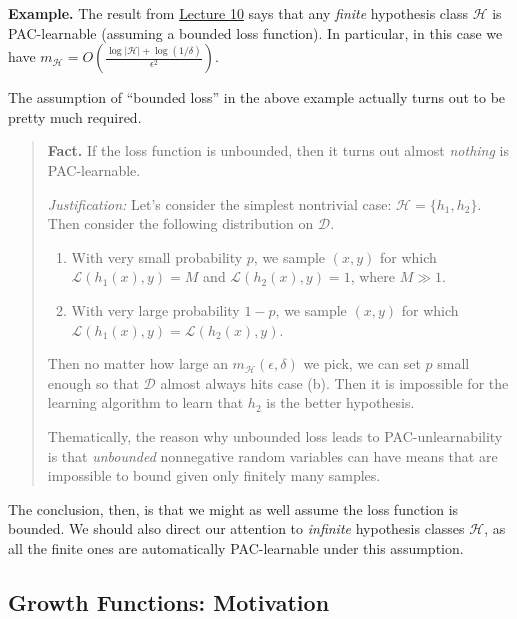\textbf{Example.}
The result from
\href{/6.790/lectures/10/#estimation-error-bounding}{Lecture 10}
says that any \emph{finite} hypothesis class $\mathcal{H}$
is PAC-learnable (assuming a bounded loss function).
In particular, in this case we have
$m_{\mathcal{H}} = O\left(
    \frac{\log|\mathcal{H}| + \log(1/\delta)}{\epsilon^2}
\right)$.

The assumption of ``bounded loss'' in the above example
actually turns out to be pretty much required.

\begin{quote}
    \textbf{Fact.}
    If the loss function is unbounded,
    then it turns out almost \emph{nothing} is PAC-learnable.

    \emph{Justification:}
    Let's consider the simplest nontrivial case: $\mathcal{H} = \{h_1, h_2\}$.
    Then consider the following distribution on $\mathcal{D}$.
    \begin{enumerate}
        \item[(a)] With very small probability $p$,
        we sample $(x, y)$ for which
        $\mathcal{L}(h_1(x), y) = M$
        and $\mathcal{L}(h_2(x), y) = 1$,
        where $M \gg 1$.
        \item[(b)] With very large probability $1 - p$,
        we sample $(x, y)$ for which
        $\mathcal{L}(h_1(x), y) = \mathcal{L}(h_2(x), y)$.
    \end{enumerate}
    Then no matter how large an $m_{\mathcal{H}}(\epsilon, \delta)$ we pick,
    we can set $p$ small enough so that
    $\mathcal{D}$ almost always hits case (b).
    Then it is impossible for the learning algorithm
    to learn that $h_2$ is the better hypothesis.

    Thematically, the reason why unbounded loss
    leads to PAC-unlearnability is that
    \emph{unbounded} nonnegative random variables
    can have means that are
    impossible to bound
    given only finitely many samples.
\end{quote}

The conclusion, then, is that
we might as well assume the loss function is bounded.
We should also direct our attention to
\emph{infinite} hypothesis classes $\mathcal{H}$,
as all the finite ones are automatically PAC-learnable
under this assumption.

\subsection{Growth Functions: Motivation}

